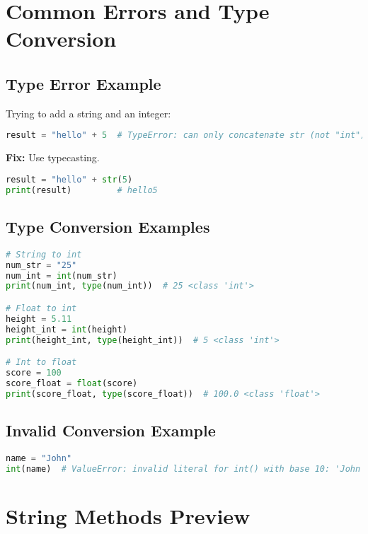 \section{Common Errors and Type Conversion}

\subsection{Type Error Example}

Trying to add a string and an integer:

\begin{lstlisting}[language=Python]
result = "hello" + 5  # TypeError: can only concatenate str (not "int") to str
\end{lstlisting}

\textbf{Fix:} Use typecasting.

\begin{lstlisting}[language=Python]
result = "hello" + str(5)
print(result)         # hello5
\end{lstlisting}

\subsection{Type Conversion Examples}

\begin{lstlisting}[language=Python]
# String to int
num_str = "25"
num_int = int(num_str)
print(num_int, type(num_int))  # 25 <class 'int'>

# Float to int
height = 5.11
height_int = int(height)
print(height_int, type(height_int))  # 5 <class 'int'>

# Int to float
score = 100
score_float = float(score)
print(score_float, type(score_float))  # 100.0 <class 'float'>
\end{lstlisting}

\subsection{Invalid Conversion Example}

\begin{lstlisting}[language=Python]
name = "John"
int(name)  # ValueError: invalid literal for int() with base 10: 'John'
\end{lstlisting}

\section{String Methods Preview}

